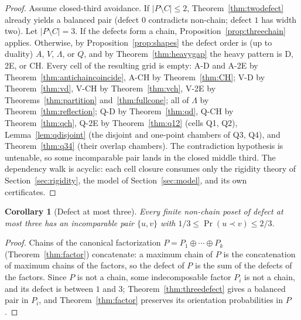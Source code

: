 \documentclass[11pt]{article}
\newtheorem{corollary}[theorem]{Corollary}
\theoremstyle{definition}
\theoremstyle{remark}
\newcommand{\pr}{\operatorname{Pr}}
\begin{document}
\begin{proof}
Assume closed-third avoidance. If $|P\setminus C|\le2$, Theorem~\ref{thm:twodefect}
already yields a balanced pair (defect $0$ contradicts non-chain; defect $1$ has width
two). Let $|P\setminus C|=3$. If the defects form a chain,
Proposition~\ref{prop:threechain} applies. Otherwise, by
Proposition~\ref{prop:shapes} the defect order is (up to duality) $A$, $V$, $\Lambda$,
or $Q$, and by Theorem~\ref{thm:heavygap} the heavy pattern is D, 2E, or CH. Every cell
of the resulting grid is empty:
A-D and A-2E by Theorem~\ref{thm:antichaincoincide}, A-CH by Theorem~\ref{thm:CH};
V-D by Theorem~\ref{thm:vd}, V-CH by Theorem~\ref{thm:vch}, V-2E by
Theorems~\ref{thm:partition} and~\ref{thm:fullcone}; all of $\Lambda$ by
Theorem~\ref{thm:reflection}; Q-D by Theorem~\ref{thm:qd}, Q-CH by
Theorem~\ref{thm:qch}, Q-2E by Theorem~\ref{thm:q12} (cells Q1, Q2),
Lemma~\ref{lem:qdisjoint} (the disjoint and one-point chambers of Q3, Q4), and
Theorem~\ref{thm:q34} (their overlap chambers). The
contradiction hypothesis is untenable, so some incomparable pair lands in the closed
middle third. The dependency walk is acyclic: each cell closure consumes only the
rigidity theory of Section~\ref{sec:rigidity}, the model of Section~\ref{sec:model}, and
its own certificates.
\end{proof}

\begin{corollary}[Defect at most three]\label{cor:defect3}
Every finite non-chain poset of defect at most three has an incomparable pair
$\{u,v\}$ with $1/3\le\pr(u\prec v)\le2/3$.
\end{corollary}

\begin{proof}
Chains of the canonical factorization $P=P_1\oplus\cdots\oplus P_k$
(Theorem~\ref{thm:factor}) concatenate: a maximum chain of $P$ is the concatenation of
maximum chains of the factors, so the defect of $P$ is the sum of the defects of the
factors. Since $P$ is not a chain, some indecomposable factor $P_i$ is not a chain, and
its defect is between $1$ and $3$; Theorem~\ref{thm:threedefect} gives a balanced pair
in $P_i$, and Theorem~\ref{thm:factor} preserves its orientation probabilities in $P$.
\end{proof}
\end{document}
